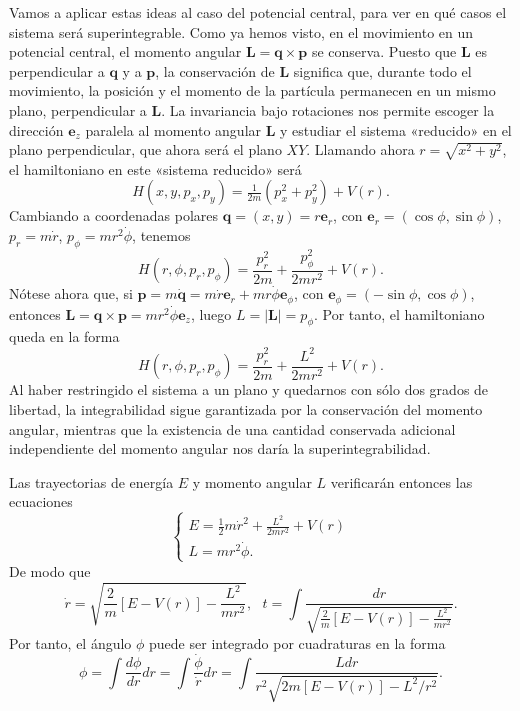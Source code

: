 \documentclass[11pt,a4paper,twoside]{article}
\theoremstyle{definition} \newtheorem{defn}[thm]{Definición}
\theoremstyle{definition} \newtheorem{ejemplo}[thm]{Ejemplo}
\theoremstyle{definition} \newtheorem{ejercicio}[thm]{Ejercicio}
\theoremstyle{remark} \newtheorem*{obs}{Observación}
\newcommand{\vect}[1]{\mathbf{#1}}
\begin{document}
  Vamos a aplicar estas ideas al caso del potencial central, para ver en qué casos el sistema será superintegrable. Como ya hemos visto, en el movimiento en un potencial central, el momento angular $\vect{L}=\vect{q}\times \vect{p}$ se conserva. Puesto que $\vect{L}$ es perpendicular a $\vect{q}$ y a $\vect{p}$, la conservación de $\vect{L}$ significa que, durante todo el movimiento, la posición y el momento de la partícula permanecen en un mismo plano, perpendicular a $\vect{L}$. La invariancia bajo rotaciones nos permite escoger la dirección $\vect{e}_z$ paralela al momento angular $\vect{L}$ y estudiar el sistema «reducido» en el plano perpendicular, que ahora será el plano $XY$. Llamando ahora $r=\sqrt{x^2+y^2}$, el hamiltoniano en este «sistema reducido» será
  \begin{equation}
    H(x,y,p_x,p_y)= \tfrac{1}{2m}(p_x^2+p_y^2)+V(r).
  \end{equation}
  Cambiando a coordenadas polares $\vect{q}=(x,y)=r\vect{e}_{r}$, con $\vect{e}_r=(\cos \phi, \sin \phi)$, $p_r=m\dot r$, $p_{\phi}=mr^2\dot \phi$, tenemos
  \begin{equation}
    H(r,\phi,p_r,p_{\phi})=\frac{p_r^2}{2m}+\frac{p_{\phi}^2}{2mr^2}+V(r). 
  \end{equation}
  Nótese ahora que, si $\vect{p}=m\dot{\vect{q}}=m\dot r \vect{e}_r + mr \dot \phi \vect{e}_{\phi}$, con $\vect{e}_{\phi}=(-\sin \phi,\cos \phi)$, entonces $\vect{L}=\vect{q}\times \vect{p}=mr^2\dot \phi \vect{e}_z$, luego $L=|\vect{L}|=p_{\phi}$. Por tanto, el hamiltoniano queda en la forma
  \begin{equation}
    H(r,\phi,p_r,p_{\phi})=\frac{p_r^2}{2m}+\frac{L^2}{2mr^2}+V(r). 
  \end{equation}
  Al haber restringido el sistema a un plano y quedarnos con sólo dos grados de libertad, la integrabilidad sigue garantizada por la conservación del momento angular, mientras que la existencia de una cantidad conservada adicional independiente del momento angular nos daría la superintegrabilidad.

  Las trayectorias de energía $E$ y momento angular $L$ verificarán entonces las ecuaciones
  \begin{equation}
    \begin{cases}
    E=\tfrac{1}{2}m\dot r^2+\frac{L^2}{2mr^2}+V(r) \\
    L=mr^2\dot \phi.
  \end{cases}
  \end{equation}
  De modo que
  \begin{equation}
      \dot r=\sqrt{\frac{2}{m}[E-V(r)]-\frac{L^2}{mr^2}}, \ \ \  
    t=\int \frac{dr}{\sqrt{\frac{2}{m}[E-V(r)]-\frac{L^2}{mr^2}}}.
  \end{equation}
  Por tanto, el ángulo $\phi$ puede ser integrado por cuadraturas en la forma
  \begin{equation}
    \phi=\int \frac{d\phi}{dr}dr=\int \frac{\dot{\phi}}{\dot{r}}dr=\int\frac{Ldr}{r^2\sqrt{2m[E-V(r)]-L^2/r^2}}. 
    \label{eq:intphi}
  \end{equation}
\end{document}
